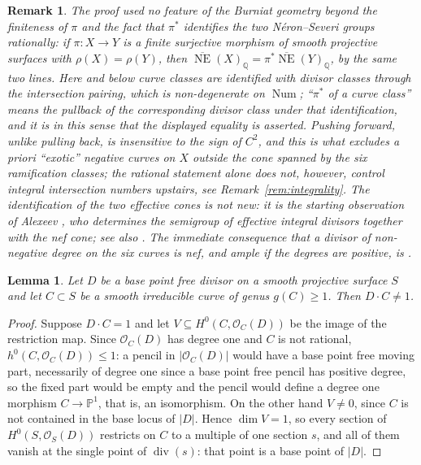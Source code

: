 \documentclass[10pt,a4paper]{amsart}
\newtheorem{lemma}[theorem]{Lemma}
\newtheorem{remark}[theorem]{Remark}
\newcommand{\OO}{\mathcal{O}}
\newcommand{\PP}{\mathbb{P}}
\newcommand{\Num}{\operatorname{Num}}
\newcommand{\QQ}{\mathbb{Q}}
\newcommand{\NE}{\overline{\operatorname{NE}}}
\begin{document}
\begin{remark}\label{rem:mori-general}
The proof used no feature of the Burniat geometry beyond the finiteness of $\pi$ and the fact that $\pi^*$ identifies the two N\'eron--Severi groups rationally: \emph{if $\pi:X\to Y$ is a finite surjective morphism of smooth projective surfaces with $\rho(X)=\rho(Y)$, then $\NE(X)_\QQ=\pi^*\NE(Y)_\QQ$}, by the same two lines. Here and below curve classes are identified with divisor classes through the intersection pairing, which is non-degenerate on $\Num$; ``$\pi^*$ of a curve class'' means the pullback of the corresponding divisor class under that identification, and it is in this sense that the displayed equality is asserted. Pushing forward, unlike pulling back, is insensitive to the sign of $C^2$, and this is what excludes a priori ``exotic'' negative curves on $X$ outside the cone spanned by the six ramification classes; the rational statement alone does not, however, control \emph{integral} intersection numbers upstairs, see Remark~\ref{rem:integrality}. The identification of the two effective cones is not new: it is the starting observation of Alexeev \cite[\S4]{Ale16}, who determines the semigroup of effective \emph{integral} divisors together with the nef cone; see also \cite{AO13}. The immediate consequence that a divisor of non-negative degree on the six curves is nef, and ample if the degrees are positive, is \cite[Prop.~4.2]{Cho26}.
\end{remark}

\begin{lemma}\label{lem:bpf-degree}
Let $D$ be a base point free divisor on a smooth projective surface $S$ and let $C\subset S$ be a smooth irreducible curve of genus $g(C)\ge1$. Then $D\cdot C\neq1$.
\end{lemma}

\begin{proof}
Suppose $D\cdot C=1$ and let $V\subseteq H^0(C,\OO_C(D))$ be the image of the restriction map. Since $\OO_C(D)$ has degree one and $C$ is not rational, $h^0(C,\OO_C(D))\le1$: a pencil in $|\OO_C(D)|$ would have a base point free moving part, necessarily of degree one since a base point free pencil has positive degree, so the fixed part would be empty and the pencil would define a degree one morphism $C\to\PP^1$, that is, an isomorphism. On the other hand $V\neq0$, since $C$ is not contained in the base locus of $|D|$. Hence $\dim V=1$, so every section of $H^0(S,\OO_S(D))$ restricts on $C$ to a multiple of one section $s$, and all of them vanish at the single point of $\operatorname{div}(s)$: that point is a base point of $|D|$.
\end{proof}
\end{document}
